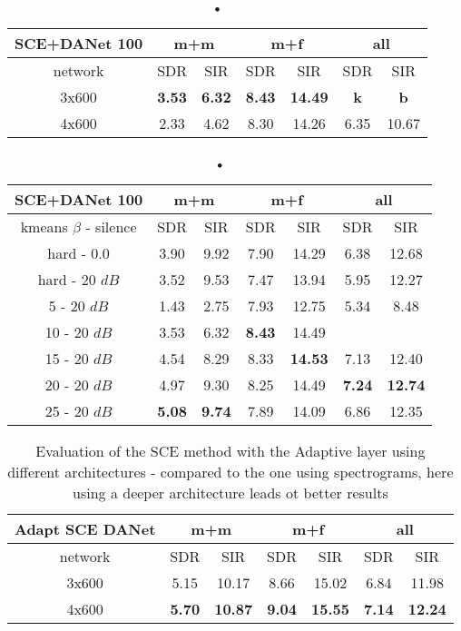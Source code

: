 \documentclass[master,final,11pt]{iscs-thesis}
\begin{document}
\begin{table}[h]
\centering
\begin{tabular}{c|c|c|c|c|c|c}
SCE+DANet 100 & \multicolumn{2}{c|}{m+m} & \multicolumn{2}{c|}{m+f} & \multicolumn{2}{c}{all} \\ 
\hline 
network & SDR & SIR & SDR & SIR & SDR & SIR \\ 
\hline 
3x600 & \textbf{3.53} & \textbf{6.32} & \textbf{8.43} & \textbf{14.49} & \textbf{k} & \textbf{b} \\ 
4x600 & 2.33 & 4.62 & 8.30 & 14.26 & 6.35 & 10.67 \\  
\end{tabular}
\captionsetup{justification=centering}
\caption{•}
\label{table:SCE100DANETarch}
\end{table}


\begin{table}[h]
\centering
\begin{tabular}{c|c|c|c|c|c|c}
SCE+DANet 100 & \multicolumn{2}{c|}{m+m} & \multicolumn{2}{c|}{m+f} & \multicolumn{2}{c}{all} \\ 
\hline 
kmeans $\beta$ - silence & SDR & SIR & SDR & SIR & SDR & SIR \\ 
\hline
hard - 0.0  & 3.90 & 9.92 & 7.90 & 14.29 & 6.38 & 12.68 \\ 
hard - 20 $dB$  & 3.52 & 9.53 & 7.47 & 13.94 & 5.95 & 12.27 \\
\hline
\hline
5 - 20 $dB$  & 1.43 & 2.75 & 7.93 & 12.75 & 5.34 & 8.48 \\ 
10 - 20 $dB$  & 3.53 & 6.32 & \textbf{8.43} & 14.49 &  &  \\ 
15 - 20 $dB$ & 4.54 & 8.29 & 8.33 & \textbf{14.53} & 7.13 & 12.40 \\ 
20 - 20 $dB$ & 4.97 & 9.30 & 8.25 & 14.49 & \textbf{7.24} & \textbf{12.74} \\ 
25 - 20 $dB$ & \textbf{5.08} & \textbf{9.74} & 7.89 & 14.09 & 6.86 & 12.35 \\ 
\end{tabular}
\captionsetup{justification=centering}
\caption{•}
\label{table:SCE100DANET}
\end{table}

\begin{table}[h]
\centering
\begin{tabular}{c|c|c|c|c|c|c}
Adapt SCE DANet & \multicolumn{2}{c|}{m+m} & \multicolumn{2}{c|}{m+f} & \multicolumn{2}{c}{all} \\ 
\hline 
network & SDR & SIR & SDR & SIR & SDR & SIR \\ 
\hline 
3x600 & 5.15 & 10.17 & 8.66 & 15.02 & 6.84 & 11.98 \\ 
4x600 & \textbf{5.70} & \textbf{10.87} & \textbf{9.04} & \textbf{15.55} & \textbf{7.14} & \textbf{12.24} \\  
\end{tabular}
\caption{Evaluation of the SCE method with the Adaptive layer using different architectures - compared to the one using spectrograms, here using a deeper architecture leads ot better results}
\label{table:AdaptSCEDANETarch}
\end{table}
\end{document}
